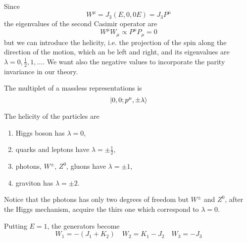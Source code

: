     Since
    \begin{equation}
        W^\mu = J_3 (E, 0, 0 E) = J_3 P^\mu 
    \end{equation}
    the eigenvalues of the second Casimir operator are 
    \begin{equation*}
        W^\mu W_\mu \propto P^\mu P_\mu = 0
    \end{equation*}
    but we can introduce the helicity, i.e. the projection of the spin along the direction of the motion, which an be left and right, and its eigenvalues are $\lambda = 0, \frac{1}{2}, 1, \ldots$. We want also the negative values to incorporate the parity invariance in our theory. 
    
    The multiplet of a massless representations is 
    \begin{equation*}
        \vert0, 0 ; p^\mu, \pm \lambda\rangle
    \end{equation*}

    The helicity of the particles are 
    \begin{enumerate}
        \item Higgs boson has $\lambda = 0$,
        \item quarks and leptons have $\lambda = \pm \frac{1}{2}$,
        \item photons, $W^\pm$, $Z^0$, gluons have $\lambda = \pm 1$,
        \item graviton has $\lambda = \pm 2$.
    \end{enumerate}

    Notice that the photons has only two degrees of freedom but $W^\pm$ and $Z^0$, after the Higgs mechanism, acquire the thirs one which correspond to $\lambda = 0$.

    Putting $E = 1$, the generators become 
    \begin{equation*}
        W_1 = - (J_1 + K_2) \quad W_2 = K_1 - J_2 \quad W_3 = -J_3
    \end{equation*}

